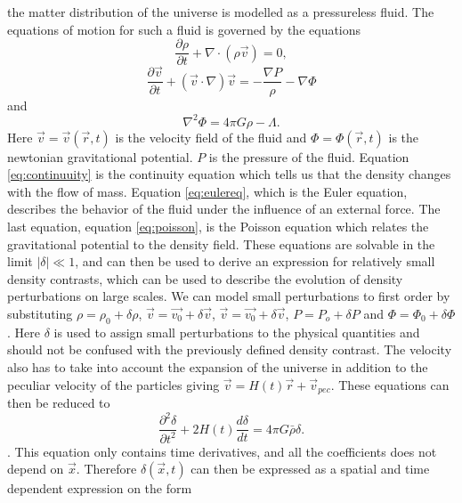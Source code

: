 the matter distribution of the universe is modelled as a pressureless fluid. The equations of
motion for such a fluid is governed by the equations
\begin{equation}\label{eq:continuuity}
    \frac{\partial \rho}{\partial t} + \nabla\cdot(\rho \vec{v})=0,
\end{equation}
\begin{equation}\label{eq:eulereq}
    \frac{\partial \vec{v}}{\partial t} + (\vec{v}\cdot\nabla)\vec{v}=-\frac{\nabla P}{\rho}-\nabla \Phi
\end{equation}
and
\begin{equation}\label{eq:poisson}
    \nabla ^2\Phi=4\pi G\rho -\Lambda.
\end{equation}
Here $\vec{v}=\vec{v}(\vec{r},t)$ is the velocity field of the fluid and $\Phi=\Phi(\vec{r},t)$
is the newtonian gravitational potential. $P$ is the pressure of the fluid. Equation \ref{eq:continuuity} is the
continuity equation which tells us that the density changes with the flow of
mass. Equation \ref{eq:eulereq}, which is the Euler equation, describes the
behavior of the fluid under the influence of an external force. The last
equation, equation \ref{eq:poisson}, is the Poisson equation which relates the
gravitational potential to the density field. These equations are solvable in
the limit $\vert\delta\vert \ll 1$, and can then be used to derive an expression
for relatively small density contrasts, which can be used to describe the
evolution of density perturbations on large scales. We can model small perturbations to first order by substituting $\rho =
\rho_0 + \delta \rho$, $\vec{v} =\vec{v_0} + \delta \vec{v}$, $\vec{v} =\vec{v_0}
+ \delta \vec{v}$, $P = P_o + \delta P$ and $\Phi = \Phi_0 +\delta\Phi$. Here
$\delta$ is used to assign small perturbations to the physical quantities and should not be
confused with the previously defined density contrast. The velocity also has to
take into account the expansion of the universe in addition to the peculiar
velocity of the particles giving $\vec{v} = H(t)\vec{r} + \vec{v}_{pec}$. These
equations can then be reduced to 
\begin{equation}
    \frac{\partial^2 \delta}{\partial t^2} + 2H(t) \frac{d \delta}{dt}=4\pi G\bar{\rho}\delta.
\end{equation}
\cite[p.~345]{schneider2006extragalactic}. This equation only contains time derivatives, and all the coefficients does not
depend on $\vec{x}$. Therefore $\delta(\vec{x}, t)$ can then be expressed as a spatial and time
dependent expression on the form 
